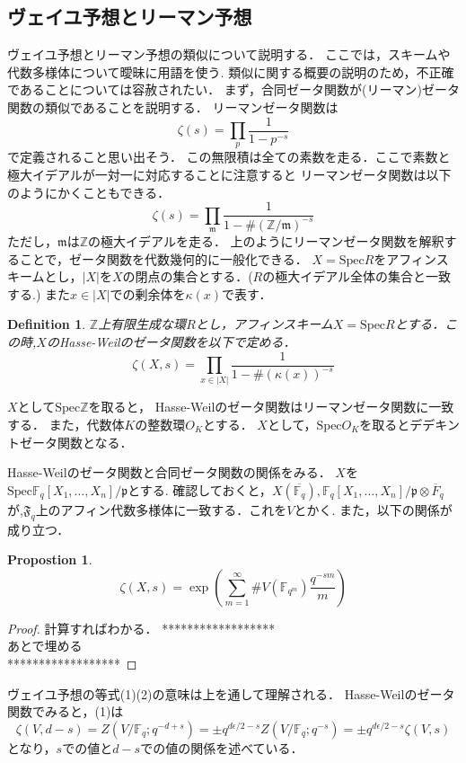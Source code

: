 \documentclass{ujarticle}
\newtheorem{dfn}[thm]{Definition}
\newtheorem{prop}[thm]{Propostion}
\begin{document}
\subsection{ヴェイユ予想とリーマン予想}
\label{sub:ヴェイユ予想とリーマン予想}

ヴェイユ予想とリーマン予想の類似について説明する．
ここでは，スキームや代数多様体について曖昧に用語を使う.
類似に関する概要の説明のため，不正確であることについては容赦されたい．
まず，合同ゼータ関数が(リーマン)ゼータ関数の類似であることを説明する．
リーマンゼータ関数は
\begin{equation*}
 \zeta(s)= \prod_{p}\frac{1}{1-p^{-s}}
\end{equation*}
で定義されること思い出そう．
この無限積は全ての素数を走る．ここで素数と極大イデアルが一対一に対応することに注意すると
リーマンゼータ関数は以下のようにかくこともできる．
\begin{equation*}
 \zeta(s) = \prod_{\mathfrak{m}}
 \frac{1}{1-{\#(\mathbb{Z}/\mathfrak{m})}^{-s}}
\end{equation*}
ただし，$\mathfrak{m}$は$\mathbb{Z}$の極大イデアルを走る．
上のようにリーマンゼータ関数を解釈することで，ゼータ関数を代数幾何的に一般化できる．
$X=\mathrm{Spec}R$をアフィンスキームとし，$|X|$を$X$の閉点の集合とする．($R$の極大イデアル全体の集合と一致する.)
また$x \in |X|$での剰余体を$\kappa(x)$で表す．
\begin{dfn}
  $\mathbb{Z}$上有限生成な環$R$とし，アフィンスキーム$X=\mathrm{Spec}R$とする．この時,$X$のHasse-Weilのゼータ関数を以下で定める．
  \begin{equation*}
   \zeta(X,s)=\prod_{x \in |X|} \frac{1}{1-\#(\kappa(x))^{-s}}
  \end{equation*}
\end{dfn}
$X$として$\mathrm{Spec}\mathbb{Z}$を取ると，
Hasse-Weilのゼータ関数はリーマンゼータ関数に一致する．
また，代数体$K$の整数環$O_K$とする．
$X$として，$\mathrm{Spec}O_K$を取るとデデキントゼータ関数となる．

Hasse-Weilのゼータ関数と合同ゼータ関数の関係をみる．
$X$を$\mathrm{Spec}\mathbb{F}_q[X_1,\dots,X_n]/\mathfrak{p}$とする.
確認しておくと，$X(\overline{\mathbb{F}_q}),\mathbb{F}_q[X_1,\dots,X_n]/\mathfrak{p}\otimes \overline{F}_q$が,$\mathfrak{F}_q$上のアフィン代数多様体に一致する．これを$V$とかく.
また，以下の関係が成り立つ．
\begin{prop}
  \begin{equation*}
   \zeta(X,s)=\exp(\sum_{m=1}^{\infty}\#V(\mathbb{F}_{q^m}) \frac{q^{-sm}}{m})
  \end{equation*}
\end{prop}
\begin{proof}
 計算すればわかる．
******************\\
あとで埋める \\
******************
\end{proof}
ヴェイユ予想の等式(1)(2)の意味は上を通して理解される．
Hasse-Weilのゼータ関数でみると，(1)は
\begin{equation*}
 \zeta(V,d-s)=Z(V/\mathbb{F}_q;q^{-d+s})=\pm q^{d \epsilon/2 -s}Z(V/\mathbb{F}_q;q^{-s})
 = \pm q^{d \epsilon/2 -s} \zeta(V,s)
\end{equation*}
となり，$s$での値と$d-s$での値の関係を述べている．
\end{document}
